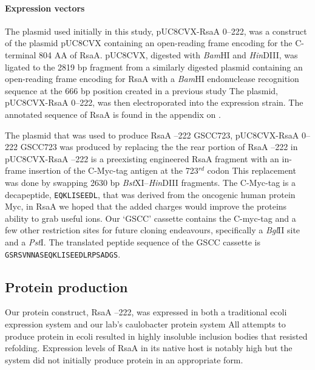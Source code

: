 \paragraph{Expression vectors} The plasmid used initially in this study, pUC8CVX-RsaA \del{}0--222, was a construct of the plasmid pUC8CVX containing an open-reading frame encoding for the C-terminal 804 AA of RsaA. pUC8CVX, digested with \textit{Bam}HI and \textit{Hin}DIII, was ligated to the 2819 bp fragment from a similarly digested plasmid containing an open-reading frame encoding for RsaA with a \textit{Bam}HI  endonuclease recognition sequence at the 666 bp position created in a previous study The plasmid, pUC8CVX-RsaA \del{} 0--222, was then electroporated into the expression strain. The annotated sequence of RsaA is found in the appendix on .

The plasmid that was used to produce RsaA --222 GSCC723, pUC8CVX-RsaA \del{}0--222 GSCC723 was produced by replacing the the rear portion of RsaA --222 in pUC8CVX-RsaA --222 is a preexisting engineered RsaA fragment with an in-frame insertion of the C-Myc-tag antigen at the 723$^{rd}$ codon This replacement was done by swapping 2630 bp \textit{Bst}XI--\textit{Hin}DIII fragments. The C-Myc-tag is a decapeptide, \texttt{EQKLISEEDL}, that was derived from the oncogenic human protein Myc, in RsaA we hoped that the added charges would improve the proteins ability to grab useful ions. Our `GSCC' cassette contains the C-myc-tag and a few other restriction sites for future cloning endeavours, specifically a \textit{Bgl}II site and a \textit{Pst}I. The translated peptide sequence of the GSCC cassette is \texttt{GSRSVNNASEQKLISEEDLRPSADGS}. 

\subsection{Protein production}
\label{sub:crystal-protein-production}

Our protein construct, RsaA --222, was expressed in both a traditional
\ac{ecoli} expression system and our lab's \ac{caulobacter}
protein system
 All attempts to produce protein in \ac{ecoli}
resulted in highly insoluble inclusion bodies that resisted
refolding. Expression levels of RsaA in its native host is notably high but
the system did not initially produce protein in an appropriate form.

